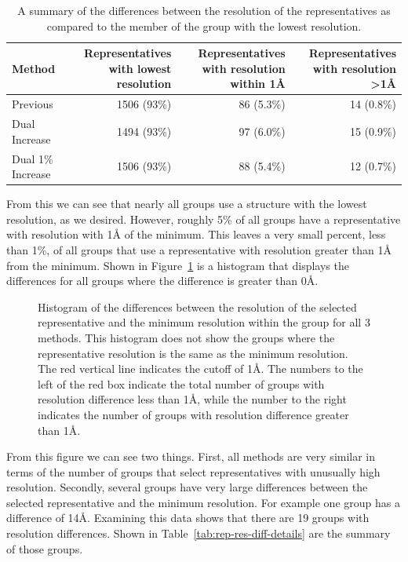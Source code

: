 \begin{table}
  \begin{tabulary}{\linewidth}{LRRR}
    \toprule
    Method &  Representatives with lowest resolution &  Representatives with
    resolution within 1{\AA}  & Representatives with resolution \textgreater 1{\AA} \\
    \midrule
    Previous          & 1506 (93\%) & 86 (5.3\%) & 14 (0.8\%) \\
    Dual Increase     & 1494 (93\%) & 97 (6.0\%) & 15 (0.9\%) \\
    Dual 1\% Increase & 1506 (93\%) & 88 (5.4\%) & 12 (0.7\%) \\
    \bottomrule
  \end{tabulary}
  \caption{A summary of the differences between the resolution of the
  representatives as compared to the member of the group with the lowest
  resolution.}
  \label{tab:res-diff-summary}
\end{table}

From this we can see that nearly all groups use a structure with the lowest
resolution, as we desired. However, roughly 5\% of all groups have a
representative with resolution with 1{\AA} of the minimum. This leaves a very small
percent, less than 1\%, of all groups that use a representative with resolution
greater than 1{\AA} from the minimum. Shown in Figure~\ref{fig:res-diff-histogram}
is a histogram that displays the differences for all groups where the difference
is greater than 0{\AA}.

\begin{figure}
  \caption{Histogram of the differences between the resolution of the selected
    representative and the minimum resolution within the group for all 3
    methods. This histogram does not show the groups where the representative
    resolution is the same as the minimum resolution.  The red vertical line
    indicates the cutoff of 1{\AA}. The numbers to the left of the red box indicate
    the total number of groups with resolution difference less than 1{\AA}, while
    the number to the right indicates the number of groups with resolution
  difference greater than 1{\AA}.}
  \label{fig:res-diff-histogram}
\end{figure}

From this figure we can see two things. First, all methods are very similar in
terms of the number of groups that select representatives with unusually high
resolution. Secondly, several groups have very large differences between the
selected representative and the minimum resolution. For example one group has a
difference of 14\AA. Examining this data shows that there are 19 groups with
resolution differences. Shown in Table~\ref{tab:rep-res-diff-details} are the
summary of those groups.

